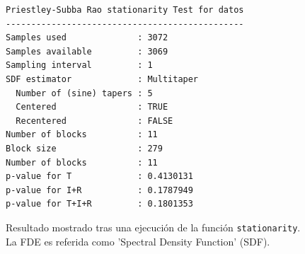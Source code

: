\begin{figure}
\centering
\begin{lstlisting}[caption={}]
Priestley-Subba Rao stationarity Test for datos
-----------------------------------------------
Samples used              : 3072 
Samples available         : 3069 
Sampling interval         : 1 
SDF estimator             : Multitaper 
  Number of (sine) tapers : 5 
  Centered                : TRUE 
  Recentered              : FALSE 
Number of blocks          : 11 
Block size                : 279 
Number of blocks          : 11 
p-value for T             : 0.4130131 
p-value for I+R           : 0.1787949 
p-value for T+I+R         : 0.1801353 
\end{lstlisting}
\caption{Resultado mostrado tras una ejecuci\'on de la funci\'on \texttt{stationarity}. 
La FDE es referida como 'Spectral Density Function' (SDF).
}
\label{res_psr}
\end{figure}

